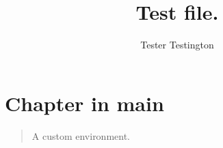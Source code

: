 \documentclass{book}
\title{Test file.}
\author{Tester Testington}
\begin{document}
\maketitle

\chapter{Chapter in main}


\begin{quote}
  A custom environment.
\end{quote}




\end{document}
